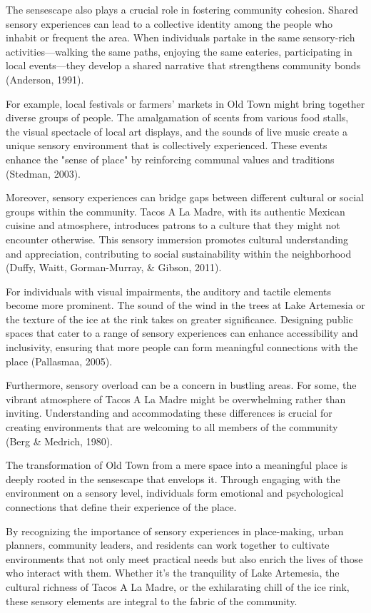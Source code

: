 \documentclass[12pt]{article}
\begin{document}
The sensescape also plays a crucial role in fostering community cohesion. Shared sensory experiences can lead to a collective identity among the people who inhabit or frequent the area. When individuals partake in the same sensory-rich activities—walking the same paths, enjoying the same eateries, participating in local events—they develop a shared narrative that strengthens community bonds (Anderson, 1991).

For example, local festivals or farmers' markets in Old Town might bring together diverse groups of people. The amalgamation of scents from various food stalls, the visual spectacle of local art displays, and the sounds of live music create a unique sensory environment that is collectively experienced. These events enhance the "sense of place" by reinforcing communal values and traditions (Stedman, 2003).

Moreover, sensory experiences can bridge gaps between different cultural or social groups within the community. Tacos A La Madre, with its authentic Mexican cuisine and atmosphere, introduces patrons to a culture that they might not encounter otherwise. This sensory immersion promotes cultural understanding and appreciation, contributing to social sustainability within the neighborhood (Duffy, Waitt, Gorman-Murray, \& Gibson, 2011).

For individuals with visual impairments, the auditory and tactile elements become more prominent. The sound of the wind in the trees at Lake Artemesia or the texture of the ice at the rink takes on greater significance. Designing public spaces that cater to a range of sensory experiences can enhance accessibility and inclusivity, ensuring that more people can form meaningful connections with the place (Pallasmaa, 2005).

Furthermore, sensory overload can be a concern in bustling areas. For some, the vibrant atmosphere of Tacos A La Madre might be overwhelming rather than inviting. Understanding and accommodating these differences is crucial for creating environments that are welcoming to all members of the community (Berg \& Medrich, 1980).

The transformation of Old Town from a mere space into a meaningful place is deeply rooted in the sensescape that envelops it. Through engaging with the environment on a sensory level, individuals form emotional and psychological connections that define their experience of the place.

By recognizing the importance of sensory experiences in place-making, urban planners, community leaders, and residents can work together to cultivate environments that not only meet practical needs but also enrich the lives of those who interact with them. Whether it's the tranquility of Lake Artemesia, the cultural richness of Tacos A La Madre, or the exhilarating chill of the ice rink, these sensory elements are integral to the fabric of the community.
\end{document}
